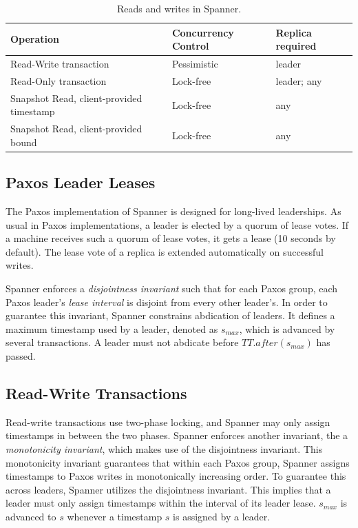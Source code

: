 \documentclass[onecolumn, a4paper, 10pt]{article}
\begin{document}
\begin{table}[ht]
  \centering
  \begin{tabular}{|l||l|l|}
    \hline
    {\bfseries Operation} & {\bfseries Concurrency Control} &
    {\bfseries Replica required} \tabularnewline
    \hline\hline
    Read-Write transaction & Pessimistic & leader \tabularnewline
    \hline
    Read-Only transaction & Lock-free & leader; any
    \tabularnewline
    \hline
    Snapshot Read, client-provided timestamp & Lock-free & any \tabularnewline
    \hline
    Snapshot Read, client-provided bound & Lock-free & any \tabularnewline
    \hline
  \end{tabular}
  \caption{Reads and writes in Spanner.}
  \label{tbl:reads-writes}
\end{table}

\subsection{Paxos Leader Leases}
\label{subsec:paxos-leader-leases}

The Paxos implementation of Spanner is designed for long-lived leaderships. As
usual in Paxos implementations, a leader is elected by a quorum of lease votes.
If a machine receives such a quorum of lease votes, it gets a lease (10 seconds
by default). The lease vote of a replica is extended automatically on successful
writes.

Spanner enforces a \emph{disjointness invariant} such that for each Paxos group,
each Paxos leader's \emph{lease interval} is disjoint from every other leader's.
In order to guarantee this invariant, Spanner constrains abdication of leaders.
It defines a maximum timestamp used by a leader, denoted as $s_{max}$, which is
advanced by several transactions. A leader must not abdicate before
$TT.after\left(s_{max}\right)$ has passed.

\subsection{Read-Write Transactions}
\label{subsec:read-write-transactions}

Read-write transactions use two-phase locking, and Spanner may only assign
timestamps in between the two phases. Spanner enforces another invariant, the
a \emph{monotonicity invariant}, which makes use of the disjointness invariant.
This monotonicity invariant guarantees that within each Paxos group, Spanner
assigns timestamps to Paxos writes in monotonically increasing order. To guarantee
this across leaders, Spanner utilizes the disjointness invariant. This implies
that a leader must only assign timestamps within the interval of its leader
lease. $s_{max}$ is advanced to $s$ whenever a timestamp $s$ is assigned by a
leader.
\end{document}
